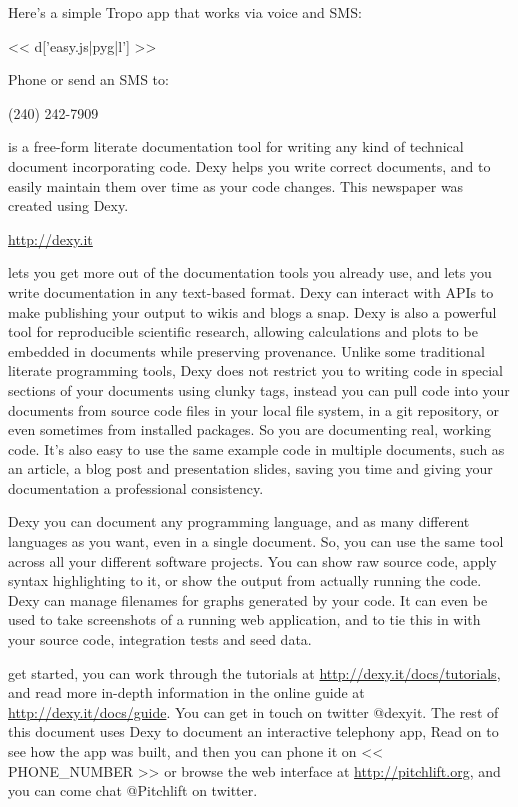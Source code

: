 \documentclass[custom, plainsections]{sciposter}
\begin{document}
\begin{multicols*}{3}
Here's a simple Tropo app that works via voice and SMS:

<< d['easy.js|pyg|l'] >>

Phone or send an SMS to:

\Large
\begin{center}
(240) 242-7909
\end{center}
\small

 is a free-form literate documentation tool for writing any kind of technical document incorporating code. Dexy helps you write correct documents, and to easily maintain them over time as your code changes. This newspaper was created using Dexy.

\large
\begin{center}
\href{http://bit.ly/xCJXxJ}{http://dexy.it}
\end{center}
\small

 lets you get more out of the documentation tools you already use, and lets you write documentation in any text-based format. Dexy can interact with APIs to make publishing your output to wikis and blogs a snap. Dexy is also a powerful tool for reproducible scientific research, allowing calculations and plots to be embedded in documents while preserving provenance. Unlike some traditional literate programming tools, Dexy does not restrict you to writing code in special sections of your documents using clunky tags, instead you can pull code into your documents from source code files in your local file system, in a git repository, or even sometimes from installed packages. So you are documenting real, working code. It's also easy to use the same example code in multiple documents, such as an article, a blog post and presentation slides, saving you time and giving your documentation a professional consistency.

 Dexy you can document any programming language, and as many different languages as you want, even in a single document. So, you can use the same tool across all your different software projects. You can show raw source code, apply syntax highlighting to it, or show the output from actually running the code. Dexy can manage filenames for graphs generated by your code. It can even be used to take screenshots of a running web application, and to tie this in with your source code, integration tests and seed data.

 get started, you can work through the tutorials at \href{http://bit.ly/zj8iAj}{http://dexy.it/docs/tutorials}, and read more in-depth information in the online guide at \href{http://bit.ly/xloDcF}{http://dexy.it/docs/guide}. You can get in touch on twitter @dexyit. The rest of this document uses Dexy to document an interactive telephony app, Read on to see how the app was built, and then you can phone it on << PHONE_NUMBER >> or browse the web interface at \href{http://bit.ly/xOt1qs}{http://pitchlift.org}, and you can come chat @Pitchlift on twitter.


\end{multicols*}
\end{document}
